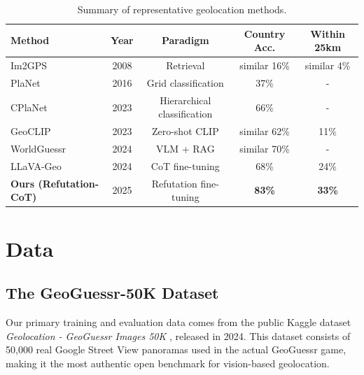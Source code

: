 \documentclass[11pt,a4paper]{article}
\begin{document}
\begin{table}[t]
\centering
\caption{Summary of representative geolocation methods.}
\label{tab:related}
\begin{tabular}{lcccc}
\toprule
Method & Year & Paradigm & Country Acc. & Within 25km \\
\midrule
Im2GPS \cite{hays2008im2gps} & 2008 & Retrieval & similar 16\% & similar 4\% \\
PlaNet \cite{weyand2016planet} & 2016 & Grid classification & 37\% & - \\
CPlaNet \cite{seo2023cpplanet} & 2023 & Hierarchical classification & 66\% & - \\
GeoCLIP \cite{ayush2021geoclip} & 2023 & Zero-shot CLIP & similar 62\% & 11\% \\
WorldGuessr \cite{chen2024worldguessr} & 2024 & VLM + RAG & similar 70\% & - \\
LLaVA-Geo \cite{liu2024llava} & 2024 & CoT fine-tuning & 68\% & 24\% \\
\textbf{Ours (Refutation-CoT)} & 2025 & Refutation fine-tuning & \textbf{83\%} & \textbf{33\%} \\
\bottomrule
\end{tabular}
\end{table}

\section{Data}
\label{sec:data}

\subsection{The GeoGuessr-50K Dataset}
Our primary training and evaluation data comes from the public Kaggle dataset \textit{Geolocation - GeoGuessr Images 50K} \cite{ubitquitin2024geolocation}, released in 2024. This dataset consists of 50,000 real Google Street View panoramas used in the actual GeoGuessr game, making it the most authentic open benchmark for vision-based geolocation.
\end{document}
